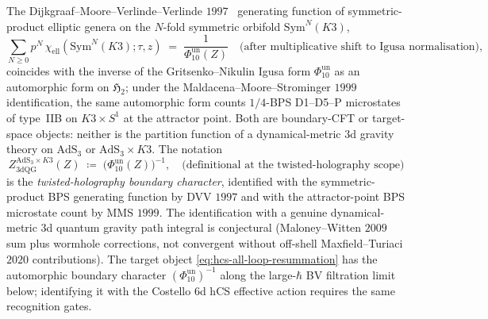 \begin{remark}
\label{rem:hcs-dvv-identification-scope}
The Dijkgraaf--Moore--Verlinde--Verlinde
$1997$~\cite{DijkgraafMooreVerlindeVerlinde1997}
generating function of symmetric-product elliptic genera on the
$N$-fold symmetric orbifold $\mathrm{Sym}^N(K3)$,
\[
 \sum_{N \ge 0} p^N\, \chi_{\mathrm{ell}}(\mathrm{Sym}^N(K3); \tau, z)
 \;=\; \frac{1}{\Phi_{10}^{\mathrm{un}}(Z)}
 \quad \text{(after multiplicative shift to Igusa normalisation)},
\]
coincides with the inverse of the Gritsenko--Nikulin Igusa form
$\Phi_{10}^{\mathrm{un}}$ as an automorphic form on $\mathfrak{H}_2$;
under the Maldacena--Moore--Strominger
$1999$~\cite{MaldacenaMooreStrominger1999} identification, the same
automorphic form counts $1/4$-BPS D1--D5--P microstates of type~IIB
on $K3 \times S^1$ at the attractor point. Both are boundary-CFT
or target-space objects: neither is the partition function of a
dynamical-metric $3$d gravity theory on $\mathrm{AdS}_3$ or
$\mathrm{AdS}_3 \times K3$. The notation
\[
 Z_{\mathrm{3dQG}}^{\mathrm{AdS}_{3}\times K3}(Z)
 \;\coloneqq\; \bigl(\Phi_{10}^{\mathrm{un}}(Z)\bigr)^{-1},
 \quad \text{(definitional at the twisted-holography scope)}
\]
is the \emph{twisted-holography boundary character}, identified with
the symmetric-product BPS generating function by DVV $1997$ and with
the attractor-point BPS microstate count by MMS $1999$. The
identification with a genuine dynamical-metric $3$d quantum gravity
path integral is conjectural (Maloney--Witten $2009$
sum plus wormhole corrections, not convergent without off-shell
Maxfield--Turiaci $2020$ contributions). The target object
\eqref{eq:hcs-all-loop-resummation} has the automorphic boundary
character $(\Phi_{10}^{\mathrm{un}})^{-1}$ along the large-$\hbar$ BV
filtration limit below; identifying it with the Costello 6d hCS
effective action requires the same recognition gates.
\end{remark}

